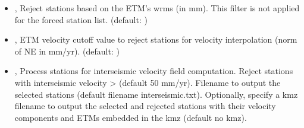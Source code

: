 \documentclass[letterpaper,10pt,english]{sphinxmanual}
\begin{document}
\begin{itemize}
\item {} 
\sphinxAtStartPar
{\hyperref[\detokenize{com:TrajectoryFit.py--sigma}]{}} , {\hyperref[\detokenize{com:TrajectoryFit.py---sigma_cutoff}]{}}  \sphinxhyphen{} Reject stations based on the ETM’s wrms (in mm). This filter is not applied for the forced station list. (default: \sphinxcode{\sphinxupquote{{[}2.5{]}}})

\item {} 
\sphinxAtStartPar
{\hyperref[\detokenize{com:TrajectoryFit.py--vel}]{}} , {\hyperref[\detokenize{com:TrajectoryFit.py---velocity_cutoff}]{}}  \sphinxhyphen{} ETM velocity cutoff value to reject stations for velocity interpolation (norm of NE in mm/yr). (default: \sphinxcode{\sphinxupquote{{[}50{]}}})

\item {} 
\sphinxAtStartPar
{\hyperref[\detokenize{com:TrajectoryFit.py--interseismic}]{}} , {\hyperref[\detokenize{com:TrajectoryFit.py---interseismic_process}]{}}  \sphinxhyphen{} Process stations for interseismic velocity field computation. Reject stations with interseismic velocity \textgreater{}  (default 50 mm/yr). Filename to output the selected stations (default filename interseismic.txt). Optionally, specify a kmz filename to output the selected and rejected stations with their velocity components and ETMs embedded in the kmz (default no kmz).


\end{itemize}
\end{document}
